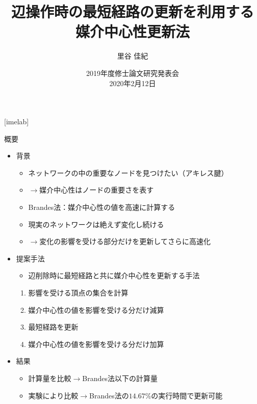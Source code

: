 \documentclass[dvipdfmx,fleqn]{beamer}
\title[媒介中心性更新法]{辺操作時の最短経路の更新を利用する \\ 媒介中心性更新法}
\author[里谷]{里谷 佳紀}
\institute[情数工研]{情報数理工学研究室}
\date[研究発表会]{2019年度修士論文研究発表会 \\ 2020年2月12日}
\begin{document}
{
  [imelab]
  \begin{frame}
    \titlepage
  \end{frame}
}

\begin{frame}{概要}
  \begin{itemize}
  \item 背景
    \begin{itemize}
    \item ネットワークの中の重要なノードを見つけたい（アキレス腱）
    \item[] $\rightarrow$\alert{媒介中心性}はノードの重要さを表す
    \item Brandes法：媒介中心性の値を高速に計算する
    \item 現実のネットワークは\alert{絶えず変化し続ける}
    \item[] $\rightarrow$変化の影響を受ける部分だけを更新してさらに高速化
    \end{itemize}
  \item 提案手法
    \begin{itemize}
    \item 辺削除時に最短経路と共に媒介中心性を更新する手法
    \end{itemize}
    \begin{enumerate}
    \item 影響を受ける頂点の集合を計算
    \item 媒介中心性の値を影響を受ける分だけ\alert{減算}
    \item \alert{最短経路を更新}
    \item 媒介中心性の値を影響を受ける分だけ\alert{加算}
    \end{enumerate}
  \item 結果
    \begin{itemize}
    \item 計算量を比較$\rightarrow$Brandes法以下の計算量
    \item 実験により比較$\rightarrow$Brandes法の$14.67\%$の実行時間で更新可能
    \end{itemize}
  \end{itemize}

\end{frame}
\end{document}
